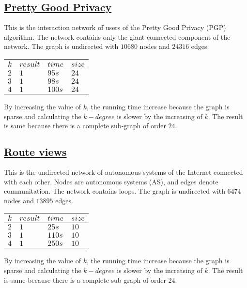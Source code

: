 \documentclass{article}
\begin{document}
\subsection{\href{http://konect.uni-koblenz.de/networks/arenas-pgp}{Pretty Good Privacy}}
This is the interaction network of users of the Pretty Good Privacy (PGP) algorithm. The network contains only the giant connected component of the network. The graph is undirected with $10680$ nodes and $24316$ edges. 
\begin{center}
	\begin{tabular}{ | m{1cm} | m{1cm}| m{2cm} | m{1cm} | } 
		\hline
		$k$ & $result$ & $time$ & $size$\\ 
		\hline
		$2$ & $1$ & $95s$  & $24$\\ 
		\hline
		$3$ & $1$ & $98s$  & $24$\\	 
		\hline
		$4$ & $1$ & $100s$  & $24$\\
		\hline
	\end{tabular}
\end{center}
By increasing the value of $k$, the running time increase because the graph is sparse and calculating the $k-degree$ is slower by the increasing of $k$. The result is same because there is a complete sub-graph of order $24$.

\subsection{\href{http://konect.uni-koblenz.de/networks/ca-AstroPh}{Route views}}
This is the undirected network of autonomous systems of the Internet connected with each other. Nodes are autonomous systems (AS), and edges denote communitation. The network contains loops. The graph is undirected with $6474$ nodes and $13895$ edges. 
\begin{center}
	\begin{tabular}{ | m{1cm} | m{1cm}| m{2cm} | m{1cm} | } 
		\hline
		$k$ & $result$ & $time$ & $size$\\ 
		\hline
		$2$ & $1$ & $25s$  & $10$\\ 
		\hline
		$3$ & $1$ & $110s$  & $10$\\	 
		\hline
		$4$ & $1$ & $250s$  & $10$\\
		\hline
	\end{tabular}
\end{center}
By increasing the value of $k$, the running time increase because the graph is sparse and calculating the $k-degree$ is slower by the increasing of $k$. The result is same because there is a complete sub-graph of order $24$.
\end{document}
